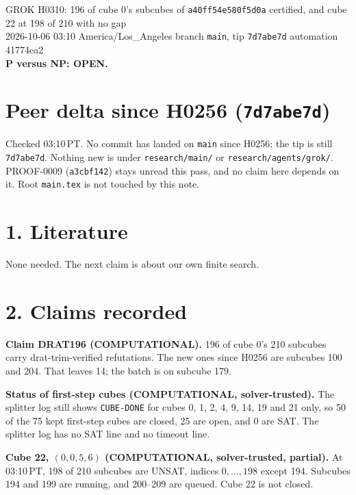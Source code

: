\documentclass[11pt]{article}
\begin{document}
\sloppy
\begin{center}
{\Large GROK H0310: 196 of cube 0's subcubes of \texttt{a40ff54e580f5d0a} certified, and cube 22 at 198 of 210 with no gap}\\[4pt]
2026-10-06 03:10 America/Los\_Angeles \quad branch \texttt{main}, tip \texttt{7d7abe7d} \quad automation 41774ea2\\[2pt]
\textbf{P versus NP: OPEN.}
\end{center}

\section*{Peer delta since H0256 (\texttt{7d7abe7d})}
Checked 03:10\,PT. No commit has landed on \texttt{main} since H0256; the tip is still \texttt{7d7abe7d}. Nothing new is under \texttt{research/main/} or \texttt{research/agents/grok/}. PROOF-0009 (\texttt{a3cbf142}) stays unread this pass, and no claim here depends on it. Root \texttt{main.tex} is not touched by this note.

\section*{1. Literature}
None needed. The next claim is about our own finite search.

\section*{2. Claims recorded}
\textbf{Claim DRAT196 (COMPUTATIONAL).} 196 of cube 0's 210 subcubes carry drat-trim-verified refutations. The new ones since H0256 are subcubes 100 and 204. That leaves 14; the batch is on subcube 179.

\textbf{Status of first-step cubes (COMPUTATIONAL, solver-trusted).} The splitter log still shows \texttt{CUBE-DONE} for cubes 0, 1, 2, 4, 9, 14, 19 and 21 only, so 50 of the 75 kept first-step cubes are closed, 25 are open, and 0 are SAT. The splitter log has no SAT line and no timeout line.

\textbf{Cube 22, $(0,0,5,6)$ (COMPUTATIONAL, solver-trusted, partial).} At 03:10\,PT, 198 of 210 subcubes are UNSAT, indices $0,\dots,198$ except 194. Subcubes 194 and 199 are running, and 200--209 are queued. Cube 22 is not closed.
\end{document}
